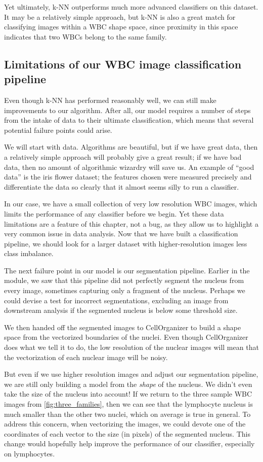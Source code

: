 Yet ultimately, k-NN outperforms much more advanced classifiers on this dataset. It may be a relatively simple approach, but k-NN is also a great match for classifying images within a WBC shape space, since proximity in this space indicates that two WBCs belong to the same family.

\FloatBarrier
{}
\subsection{Limitations of our WBC image classification pipeline}

Even though k-NN has performed reasonably well, we can still make improvements to our algorithm. After all, our model requires a number of steps from the intake of data to their ultimate classification, which means that several potential failure points could arise.

We will start with data. Algorithms are beautiful, but if we have great data, then a relatively simple approach will probably give a great result; if we have bad data, then no amount of algorithmic wizardry will save us. An example of ``good data'' is the iris flower dataset; the features chosen were measured precisely and differentiate the data so clearly that it almost seems silly to run a classifier.

In our case, we have a small collection of very low resolution WBC images, which limits the performance of any classifier before we begin. Yet these data limitations are a feature of this chapter, not a bug, as they allow us to highlight a very common issue in data analysis. Now that we have built a classification pipeline, we should look for a larger dataset with higher-resolution images less class imbalance.

The next failure point in our model is our segmentation pipeline. Earlier in the module, we saw that this pipeline did not perfectly segment the nucleus from every image, sometimes capturing only a fragment of the nucleus. Perhaps we could devise a test for incorrect segmentations, excluding an image from downstream analysis if the segmented nucleus is below some threshold size.

We then handed off the segmented images to CellOrganizer to build a shape space from the vectorized boundaries of the nuclei. Even though CellOrganizer does what we tell it to do, the low resolution of the nuclear images will mean that the vectorization of each nuclear image will be noisy.

But even if we use higher resolution images and adjust our segmentation pipeline, we are still only building a model from the \textit{shape} of the nucleus. We didn't even take the size of the nucleus into account! If we return to the three sample WBC images from \autoref{fig:three_families}, then we can see that the lymphocyte nucleus is much smaller than the other two nuclei, which on average is true in general. To address this concern, when vectorizing the images, we could devote one of the coordinates of each vector to the size (in pixels) of the segmented nucleus. This change would hopefully help improve the performance of our classifier, especially on lymphocytes.\\

